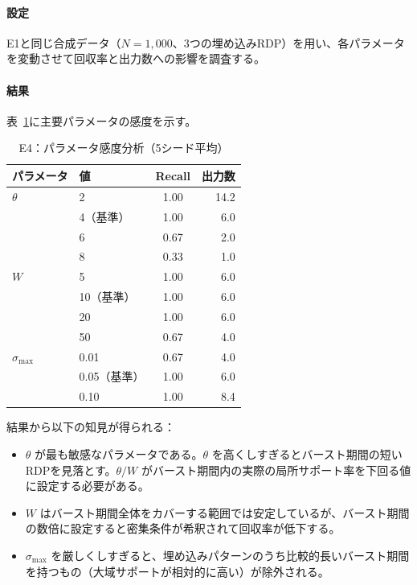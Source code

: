 \paragraph{設定}
E1と同じ合成データ（$N = 1{,}000$、3つの埋め込みRDP）を用い、各パラメータを変動させて回収率と出力数への影響を調査する。

\paragraph{結果}
表~\ref{tab:e4_sensitivity}に主要パラメータの感度を示す。

\begin{table}[t]
\centering
\caption{E4：パラメータ感度分析（5シード平均）}
\label{tab:e4_sensitivity}
\begin{tabular}{llcr}
\toprule
\textbf{パラメータ} & \textbf{値} & \textbf{Recall} & \textbf{出力数} \\
\midrule
$\theta$ & 2 & 1.00 & 14.2 \\
          & 4（基準） & 1.00 & 6.0 \\
          & 6 & 0.67 & 2.0 \\
          & 8 & 0.33 & 1.0 \\
\midrule
$W$ & 5 & 1.00 & 6.0 \\
    & 10（基準） & 1.00 & 6.0 \\
    & 20 & 1.00 & 6.0 \\
    & 50 & 0.67 & 4.0 \\
\midrule
$\sigma_{\max}$ & 0.01 & 0.67 & 4.0 \\
                & 0.05（基準） & 1.00 & 6.0 \\
                & 0.10 & 1.00 & 8.4 \\
\bottomrule
\end{tabular}
\end{table}

結果から以下の知見が得られる：
\begin{itemize}
\item $\theta$ が最も敏感なパラメータである。$\theta$ を高くしすぎるとバースト期間の短いRDPを見落とす。$\theta / W$ がバースト期間内の実際の局所サポート率を下回る値に設定する必要がある。
\item $W$ はバースト期間全体をカバーする範囲では安定しているが、バースト期間の数倍に設定すると密集条件が希釈されて回収率が低下する。
\item $\sigma_{\max}$ を厳しくしすぎると、埋め込みパターンのうち比較的長いバースト期間を持つもの（大域サポートが相対的に高い）が除外される。
\end{itemize}

